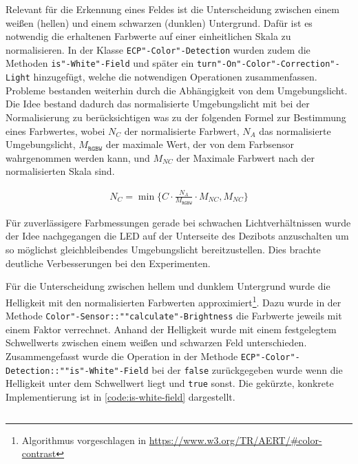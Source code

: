 Relevant für die Erkennung eines Feldes ist die Unterscheidung zwischen einem weißen (hellen) und einem schwarzen (dunklen) Untergrund. Dafür ist es notwendig die erhaltenen Farbwerte auf einer einheitlichen Skala zu normalisieren. In der Klasse \texttt{ECP"-Color"-Detection} wurden zudem die Methoden \texttt{is"-White"-Field} und später ein \texttt{turn"-On"-Color"-Correction"-Light} hinzugefügt, welche die notwendigen Operationen zusammenfassen. Probleme bestanden weiterhin durch die Abhängigkeit von dem Umgebungslicht. Die Idee bestand dadurch das normalisierte Umgebungslicht mit bei der Normalisierung zu berücksichtigen was zu der folgenden Formel zur Bestimmung eines Farbwertes, wobei $N_{C}$ der normalisierte Farbwert, $N_{A}$ das normalisierte Umgebungslicht, $M_{\texttt{RGBW}}$ der maximale Wert, der von dem Farbsensor wahrgenommen werden kann, und $M_{NC}$ der Maximale Farbwert nach der normalisierten Skala sind.

\begin{equation*}
    \begin{aligned}
        N_{C} = \min\Big\{C \cdot \frac{N_{A}}{M_{\texttt{RGBW}}} \cdot M_{NC}, M_{NC}\Big\}
    \end{aligned}
\end{equation*}

Für zuverlässigere Farbmessungen gerade bei schwachen Lichtverhältnissen wurde der Idee nachgegangen die LED auf der Unterseite des Dezibots anzuschalten um so möglichst gleichbleibendes Umgebungslicht bereitzustellen. Dies brachte deutliche Verbesserungen bei den Experimenten.

Für die Unterscheidung zwischen hellem und dunklem Untergrund wurde die Helligkeit mit den normalisierten Farbwerten approximiert\footnote{Algorithmus vorgeschlagen in \url{https://www.w3.org/TR/AERT/\#color-contrast}}. Dazu wurde in der Methode \texttt{Color"-Sensor::""calculate"-Brightness} die Farbwerte jeweils mit einem Faktor verrechnet. Anhand der Helligkeit wurde mit einem festgelegtem Schwellwerts zwischen einem weißen und schwarzen Feld unterschieden. Zusammengefasst wurde die Operation in der Methode \texttt{ECP"-Color"-Detection::""is"-White"-Field} bei der \texttt{false} zurückgegeben wurde wenn die Helligkeit unter dem Schwellwert liegt und \texttt{true} sonst. Die gekürzte, konkrete Implementierung ist in \autoref{code:is-white-field} dargestellt.

\begin{listing}[h]
    \inputminted{cpp}{../assets/code/ECPColorDetection.cpp} %
    \caption{Vereinfachter Code"=Ausschnitt zur \texttt{ECP"-Color"-Detection::""is"-White"-Field}"=Methode}
    \label{code:is-white-field}
\end{listing}

